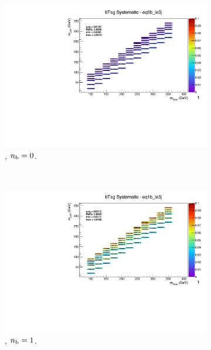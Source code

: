 \begin{figure}[ht!]
\begin{subfigure}[b]{0.32\textwidth}
    \includegraphics[width=\textwidth, page=1]{Figs/sms/t2cc/v37/systs/T2cc_bTag_eq0b_le3j.pdf}
    \caption{\njlow, $n_{\text{b}} = 0$.}
  \end{subfigure}\\
  \begin{subfigure}[b]{0.32\textwidth}
    \includegraphics[width=\textwidth, page=12]{Figs/sms/t2cc/v37/systs/T2cc_bTag_eq1b_le3j.pdf}
    \caption{\njlow, $n_{\text{b}} = 1$.}
  \end{subfigure}
  \begin{subfigure}[b]{0.32\textwidth}

\end{subfigure}
\end{figure}
